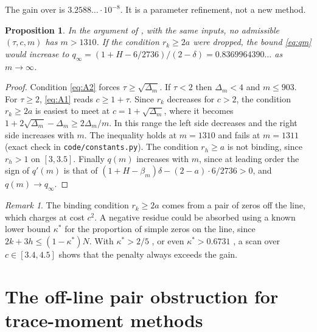 \documentclass[reqno,11pt]{amsart}
\numberwithin{equation}{section}
\theoremstyle{plain}
\newtheorem{proposition}[theorem]{Proposition}
\theoremstyle{remark}
\newtheorem{remark}[theorem]{Remark}
\begin{document}
The gain over \cite{Kna26} is $3.2588\ldots\cdot10^{-8}$. It is a parameter
refinement, not a new method.

\begin{proposition}\label{prop:limit}
In the argument of \cite{Kna26}, with the same inputs, no admissible
$(\tau,c,m)$ has $m>1310$. If the condition $r_k\ge 2a$ were dropped, the
bound \eqref{eq:qm} would increase to
$q_\infty=(1+H-6/2736)/(2-\delta)=0.8369964390\ldots$ as $m\to\infty$.
\end{proposition}

\begin{proof}
Condition \eqref{eq:A2} forces $\tau\ge\sqrt{\Delta_m}$. If $\tau<2$ then
$\Delta_m<4$ and $m\le903$. For $\tau\ge2$, \eqref{eq:A1} reads $c\ge1+\tau$.
Since $r_k$ decreases for $c>2$, the condition $r_k\ge2a$ is easiest to meet
at $c=1+\sqrt{\Delta_m}$, where it becomes
$1+2\sqrt{\Delta_m}-\Delta_m\ge 2\Delta_m/m$. In this range the left side
decreases and the right side increases with $m$. The inequality holds at
$m=1310$ and fails at $m=1311$ (exact check in \texttt{code/constants.py}).
The condition $r_h\ge a$ is not binding, since $r_h>1$ on $[3,3.5]$. Finally
$q(m)$ increases with $m$, since at leading order the sign of $q'(m)$ is that of
$(1+H-\beta_m)\delta-(2-a)\cdot6/2736>0$, and $q(m)\to q_\infty$.
\end{proof}

\begin{remark}
The binding condition $r_k\ge2a$ comes from a pair of zeros off the line,
which \cite[Lem.~4]{Kna26} charges at cost $c^2$. A negative residue could be
absorbed using a known lower bound $\kappa^{*}$ for the proportion of simple
zeros on the line, since $2k+3h\le(1-\kappa^{*})N$. With $\kappa^{*}>2/5$
\cite{Con89}, or even $\kappa^{*}>0.6731$ \cite{TG26}, a scan over
$c\in[3.4,4.5]$ shows that the penalty always exceeds the gain.
\end{remark}

\section{The off-line pair obstruction for trace-moment methods}\label{s:obstruction}
\end{document}
